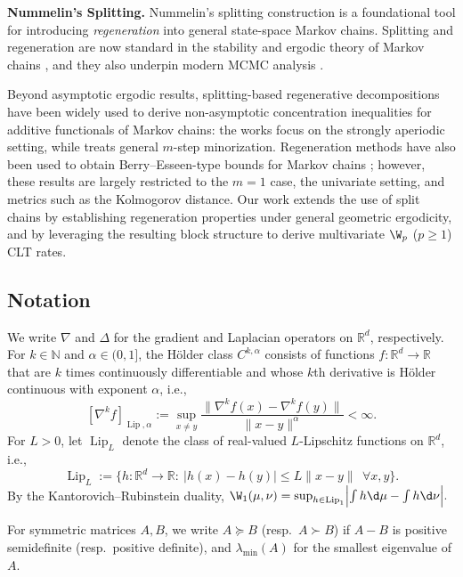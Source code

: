 \documentclass[mnsc,nonblindrev]{informs3}
\begin{document}
\noindent\textbf{Nummelin’s Splitting.} 
Nummelin's splitting construction \citep{nummelin1978splitting} is a foundational
tool for introducing \emph{regeneration} into general state-space Markov chains.
Splitting and regeneration are now standard in the stability and ergodic theory
of Markov chains \citep{Meyn12_book}, and they also underpin modern MCMC analysis \citep{mykland1995regeneration,jones2001honest}.

Beyond asymptotic ergodic results, splitting-based regenerative decompositions
have been widely used to derive non-asymptotic concentration inequalities for
additive functionals of Markov chains:
the works \citep{adamczak2008tail,adamczak2015exponential,bertail2018new} focus on
the strongly aperiodic setting, while \cite{lemanczyk2021general} treats general
$m$-step minorization. Regeneration methods have also been used to obtain
Berry--Esseen-type bounds for Markov chains
\citep{bolthausen1980berry,bolthausen1982berry,douc2008bounds}; however, these
results are largely restricted to the $m=1$ case, the univariate setting, and
metrics such as the Kolmogorov distance. Our work extends the use of split
chains by establishing regeneration properties under general geometric
ergodicity, and by leveraging the resulting block structure to derive
multivariate $\W_p$ ($p\ge 1$) CLT rates.




\subsection{Notation}\label{sec:notation}
We write $\nabla$ and $\Delta$ for the gradient and Laplacian operators on
$\mathbb R^d$, respectively. For $k\in\mathbb N$ and $\alpha\in(0,1]$, the H\"older
class $C^{k,\alpha}$ consists of functions
$f:\mathbb R^d\to\mathbb R$ that are $k$ times continuously differentiable and
whose $k$th derivative is H\"older continuous with exponent $\alpha$, i.e.,
\[
[\nabla^k f]_{\operatorname{Lip},\alpha}
:=\sup_{x\neq y}\frac{\|\nabla^k f(x)-\nabla^k f(y)\|}{\|x-y\|^\alpha}<\infty.
\]
For $L>0$, let $\operatorname{Lip}_L$ denote the class of real-valued $L$-Lipschitz functions on
$\mathbb R^d$, i.e.,
\[
\operatorname{Lip}_L:=\{h:\mathbb R^d\to\mathbb R:\ |h(x)-h(y)|\le L\|x-y\|\ \ \forall x,y\}.
\]
By the Kantorovich--Rubinstein duality, $\W_1(\mu,\nu)=\sup_{h\in \operatorname{Lip}_1}\Bigl|\int h\d\mu-\int h\d\nu\Bigr|.$

For symmetric matrices $A,B$, we write
$A\succeq B$ (resp.\ $A\succ B$) if $A-B$ is positive semidefinite (resp.\
positive definite), and $\lambda_{\min}(A)$ for the smallest eigenvalue of $A$.
\end{document}
